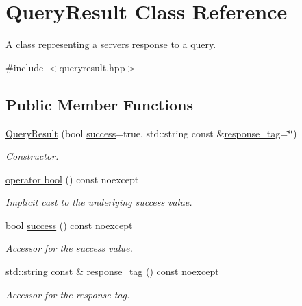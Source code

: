 \hypertarget{class_query_result}{}\section{Query\+Result Class Reference}
\label{class_query_result}


A class representing a server\textquotesingle{}s response to a query.  




{\ttfamily \#include $<$queryresult.\+hpp$>$}

\subsection*{Public Member Functions}
\begin{DoxyCompactItemize}
\item 
\hyperlink{class_query_result_ae7376f37c36d6df11cb0a6d809f54ac3}{Query\+Result} (bool \hyperlink{class_query_result_ae1b66d19c66ed5c97dd3322c3c721c82}{success}=true, std\+::string const \&\hyperlink{class_query_result_a3d238ce0ccc659d2918dac0479937d3c}{response\+\_\+tag}=\char`\"{}\char`\"{})
\begin{DoxyCompactList}\small\item\em Constructor. \end{DoxyCompactList}\item 
\mbox{\label{class_query_result_a280533eecc3453bb2e65119070cc9fc7}} 
\hyperlink{class_query_result_a280533eecc3453bb2e65119070cc9fc7}{operator bool} () const noexcept
\begin{DoxyCompactList}\small\item\em Implicit cast to the underlying success value. \end{DoxyCompactList}\item 
bool \hyperlink{class_query_result_ae1b66d19c66ed5c97dd3322c3c721c82}{success} () const noexcept
\begin{DoxyCompactList}\small\item\em Accessor for the success value. \end{DoxyCompactList}\item 
std\+::string const  \& \hyperlink{class_query_result_a3d238ce0ccc659d2918dac0479937d3c}{response\+\_\+tag} () const noexcept
\begin{DoxyCompactList}\small\item\em Accessor for the response tag. \end{DoxyCompactList}\end{DoxyCompactItemize}


